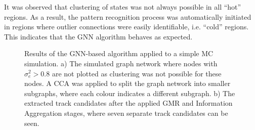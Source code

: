 It was observed that clustering of states was not always possible in all ``hot'' regions. As a result, the pattern recognition process was automatically initiated in regions where outlier connections were easily identifiable, i.e. ``cold'' regions. This indicates that the GNN algorithm behaves as expected. 


\begin{figure}[htbp]%
    \centering
    \hfill
    \caption{Results of the GNN-based algorithm applied to a simple MC simulation. a) The simulated graph network where nodes with $\sigma_e^2 > 0.8$ are not plotted as clustering was not possible for these nodes. A CCA was applied to split the graph network into smaller subgraphs, where each colour indicates a different subgraph. b) The extracted track candidates after the applied GMR and Information Aggregation stages, where seven separate track candidates can be seen.}%
    \label{fig:example-application-1}%
\end{figure}

